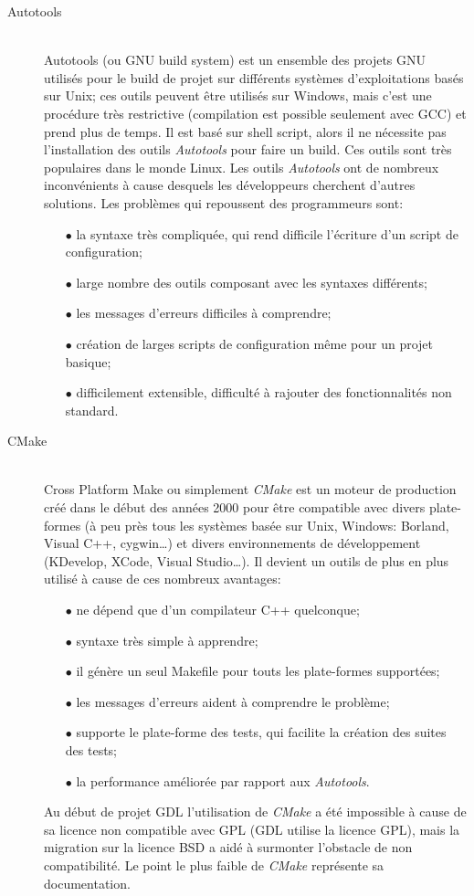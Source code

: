 \begin{description}
\item[Autotools]\hfill \\
Autotools (ou GNU build system) est un ensemble des projets GNU utilisés pour le build de projet sur différents systèmes d'exploitations basés sur Unix; ces outils peuvent être utilisés sur Windows, mais c'est une procédure très restrictive (compilation est possible seulement avec GCC) et prend plus de temps. Il est basé sur shell script, alors il ne nécessite pas l’installation des outils \textit{Autotools} pour faire un build. Ces outils sont très populaires dans le monde Linux. Les outils \textit{Autotools} ont de nombreux inconvénients à cause desquels les développeurs cherchent d'autres solutions. Les problèmes qui repoussent des programmeurs sont:
\begin{itemize}
	\item[$\bullet$] la syntaxe très compliquée, qui rend difficile l’écriture d'un
	script de configuration;
	\item[$\bullet$] large nombre des outils composant avec les syntaxes différents;
	\item[$\bullet$] les messages d'erreurs difficiles à comprendre;
	\item[$\bullet$] création de larges scripts de configuration même pour un
	projet basique;
	\item[$\bullet$] difficilement extensible, difficulté à rajouter des
	fonctionnalités non standard.
\end{itemize}

\item[CMake]\hfill \\
Cross Platform Make ou simplement \textit{CMake} est un moteur de production
créé dans le début des années 2000 pour être compatible avec divers plate-formes
(à peu près tous les systèmes basée sur Unix, Windows: Borland, Visual C++, cygwin\ldots) et divers environnements de développement (KDevelop, XCode, Visual Studio\ldots). Il devient un outils de plus en plus utilisé à cause de ces nombreux avantages:
\begin{itemize}
	\item[$\bullet$] ne dépend que d'un compilateur C++ quelconque;
	\item[$\bullet$] syntaxe très simple à apprendre;
	\item[$\bullet$] il génère un seul Makefile pour touts les plate-formes
	supportées;
	\item[$\bullet$] les messages d'erreurs aident à comprendre le problème;
	\item[$\bullet$] supporte le plate-forme des tests, qui facilite la création des suites des tests;
	\item[$\bullet$] la performance améliorée par rapport aux \textit{Autotools}.
\end{itemize}
Au début de projet GDL l'utilisation de  \textit{CMake} a été impossible à cause de sa licence non compatible avec GPL (GDL utilise la licence GPL), mais la migration sur la licence BSD a aidé à surmonter l'obstacle de non compatibilité. Le point le plus faible de \textit{CMake} représente sa documentation.
\end{description}

